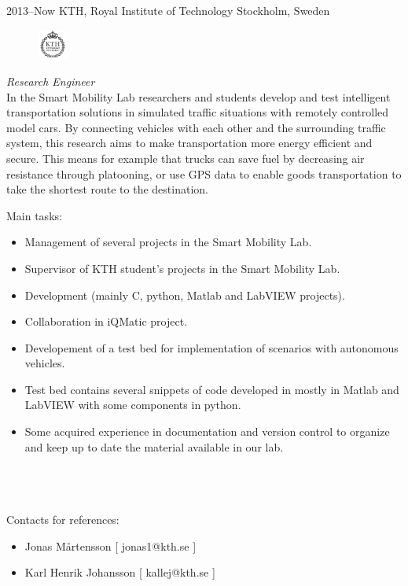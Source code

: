 \documentclass[]{friggeri-cv} %
\begin{document}
\begin{entrylist}
\entry
{2013--Now}
{KTH, Royal Institute of Technology}
{Stockholm, Sweden}
{
\begin{figure}
	\vspace{-20pt}
	\begin{center}
		\includegraphics[width=1cm,height=1cm]{kth}
	\end{center}
\end{figure}
\emph{Research Engineer} \\

In the Smart Mobility Lab researchers and students develop and test intelligent transportation solutions in simulated traffic situations with remotely controlled model cars. By connecting vehicles with each other and the surrounding traffic system, this research aims to make transportation more energy efficient and secure. This means for example that trucks can save fuel by decreasing air resistance through platooning, or use GPS data to enable goods transportation to take the shortest route to the destination.

Main tasks:
\begin{itemize}
	\item Management of several projects in the Smart Mobility Lab.
	\item Supervisor of KTH student's projects in the Smart Mobility Lab.
	\item Development (mainly C, python, Matlab and LabVIEW projects).
	\item Collaboration in iQMatic project.
	\item Developement of a test bed for implementation of scenarios with autonomous vehicles.
	\item Test bed contains several snippets of code developed in mostly in Matlab and LabVIEW with some components in python.
	\item Some acquired experience in documentation and version control to organize and keep up to date the material available in our lab.
\end{itemize}
\\ \\
\\Contacts for references: 
\begin{itemize}
	\item Jonas Mårtensson [ jonas1@kth.se ]
	\item Karl Henrik Johansson [ kallej@kth.se ]
\end{itemize}
\\
}
\end{entrylist}
\end{document}

